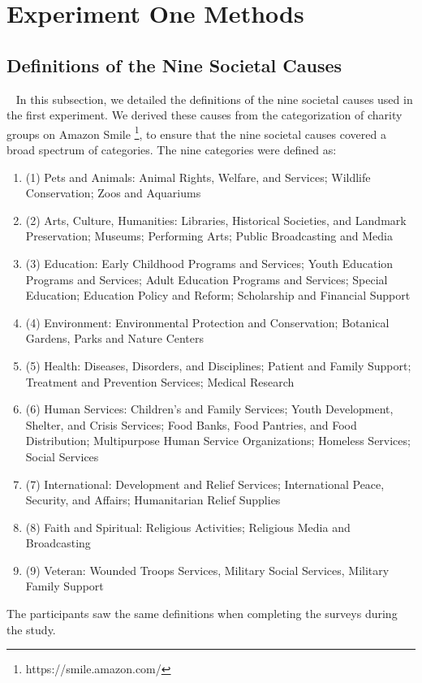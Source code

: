 \appendix

\section{Experiment One Methods}
\subsection{Definitions of the Nine Societal Causes}~\label{cause_def}
In this subsection, we detailed the definitions of the nine societal causes used in the first experiment. We derived these causes from the categorization of charity groups on Amazon Smile \footnote{https://smile.amazon.com/}, to ensure that the nine societal causes covered a broad spectrum of categories. The nine categories were defined as:
\begin{enumerate}[label={},leftmargin=\parindent]
    \item (1) Pets and Animals: Animal Rights, Welfare, and Services; Wildlife Conservation; Zoos and Aquariums
    \item (2) Arts, Culture, Humanities: Libraries, Historical Societies, and Landmark Preservation; Museums; Performing Arts; Public Broadcasting and Media
    \item (3) Education: Early Childhood Programs and Services; Youth Education Programs and Services; Adult Education Programs and Services; Special Education; Education Policy and Reform; Scholarship and Financial Support
    \item (4) Environment: Environmental Protection and Conservation; Botanical Gardens, Parks and Nature Centers
    \item (5) Health: Diseases, Disorders, and Disciplines; Patient and Family Support; Treatment and Prevention Services; Medical Research
    \item (6) Human Services: Children's and Family Services; Youth Development, Shelter, and Crisis Services; Food Banks, Food Pantries, and Food Distribution; Multipurpose Human Service Organizations; Homeless Services; Social Services
    \item (7) International: Development and Relief Services; International Peace, Security, and Affairs; Humanitarian Relief Supplies
    \item (8) Faith and Spiritual: Religious Activities; Religious Media and Broadcasting
    \item (9) Veteran: Wounded Troops Services, Military Social Services, Military Family Support
\end{enumerate}
The participants saw the same definitions when completing the surveys during the study.

